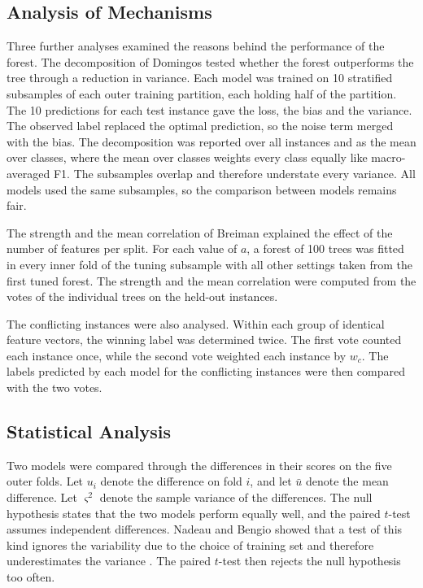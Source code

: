 \documentclass[conference]{IEEEtran}
\begin{document}
\subsection{Analysis of Mechanisms}

Three further analyses examined the reasons behind the performance of the forest.
The decomposition of Domingos tested whether the forest outperforms the tree through
a reduction in variance. Each model was trained on 10 stratified subsamples of each
outer training partition, each holding half of the partition. The 10 predictions for
each test instance gave the loss, the bias and the variance. The observed label
replaced the optimal prediction, so the noise term merged with the bias. The
decomposition was reported over all instances and as the mean over classes, where
the mean over classes weights every class equally like macro-averaged F1. The
subsamples overlap and therefore understate every variance. All models used the same
subsamples, so the comparison between models remains fair.

The strength and the mean correlation of Breiman explained the effect of the number
of features per split. For each value of $a$, a forest of 100 trees was fitted in
every inner fold of the tuning subsample with all other settings taken from the
first tuned forest. The strength and the mean correlation were computed from the
votes of the individual trees on the held-out instances.

The conflicting instances were also analysed. Within each group of identical
feature vectors, the winning label was determined twice. The first vote counted each
instance once, while the second vote weighted each instance by $w_c$. The labels
predicted by each model for the conflicting instances were then compared with the
two votes.

\subsection{Statistical Analysis}

Two models were compared through the differences in their scores on the five outer
folds. Let $u_i$ denote the difference on fold $i$, and let $\bar{u}$ denote the
mean difference. Let $\varsigma^2$ denote the sample variance of the differences.
The null hypothesis states that the two models perform equally well, and the paired
$t$-test assumes independent differences. Nadeau and Bengio showed
that a test of this kind ignores the variability due to the choice of training set
and therefore underestimates the variance \cite{nadeau2003}. The paired $t$-test
then rejects the null hypothesis too often.
\end{document}
